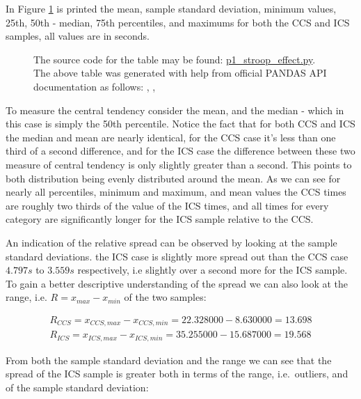\documentclass{article}
\begin{document}
In Figure \ref{fig:descriptive_data_describe} is printed the mean, sample standard deviation, minimum values,
25th, 50th - median, 75th percentiles, and maximums for both the CCS
and ICS samples, all values are in seconds. 
\begin{figure}[ht]
  \centering
  
  \caption{The source code for the table may be found:
    \href{https://github.com/8leggedunicorn/p1_stroop_effect/blob/master/p1_stroop_effect.py\#L1-L13}
        {p1\_stroop\_effect.py}.
      The above table was generated with help from official PANDAS API
      documentation as follows:
    \cite{PANDAS-csv}, \cite{PANDAS-to-latex}, \cite{PANDAS-describe-df}}
  \label{fig:descriptive_data_describe}
\end{figure}
\begin{center}
\end{center}
To measure the central tendency consider the mean, and the median - which in this
case is simply the 50th percentile. Notice the fact that for both CCS and ICS
the median and mean are nearly identical, for the CCS case it's less than one
third of a second difference, and for the ICS case the difference between these
two measure of central tendency is only slightly greater than a second. This
points to both distribution being evenly distributed around the mean. As we can
see for nearly all percentiles, minimum and maximum, and mean values the CCS
times are roughly two thirds of the value of the ICS times, and all times for
every category are significantly longer for the ICS sample relative to the CCS.

An indication of the relative spread can be observed by looking at the sample
standard deviations. the ICS case is slightly more spread out than the CCS case
\(4.797s\) to \(3.559s\) respectively, i.e slightly over a second more for the
ICS sample. To gain a better descriptive understanding of the spread we can also
look at the range, i.e.  \(R = x_{max} - x_{min}\) of the two samples:

\begin{align*}
R_{CCS} = x_{CCS,max} - x_{CCS,min} = 22.328000 - 8.630000 = 13.698\\
R_{ICS} = x_{ICS,max} - x_{ICS,min} = 35.255000 - 15.687000 = 19.568
\end{align*}

From both the sample standard deviation and the range we can see that the spread
of the ICS sample is greater both in terms of the range, i.e.~outliers, and of
the sample standard deviation:
\end{document}
